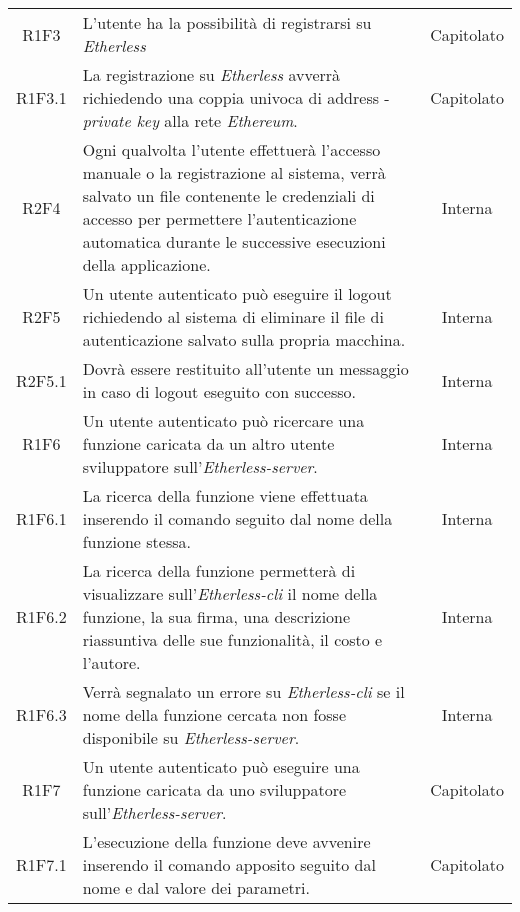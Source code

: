 \begin{longtable}{|c|p{8cm}|c|}
	R1F3 &  L'utente ha la possibilità di registrarsi su \textit{Etherless}  & Capitolato \\

	R1F3.1 &  La registrazione su \textit{Etherless} avverrà richiedendo una coppia univoca di address - \textit{private key\glo} alla rete \textit{Ethereum\glos}.  & Capitolato \\	
	
	R2F4 &  Ogni qualvolta l'utente effettuerà l'accesso manuale o la registrazione al sistema, verrà salvato un file contenente le credenziali di accesso per permettere l'autenticazione automatica durante le successive esecuzioni della applicazione.  & Interna \\
	
	R2F5 &  Un utente autenticato può eseguire il logout richiedendo al sistema di eliminare il file di autenticazione salvato sulla propria macchina.  & Interna \\
	
	R2F5.1 &  Dovrà essere restituito all'utente un messaggio in caso di logout eseguito con successo.  & Interna \\
	
	R1F6 &  Un utente autenticato può ricercare una funzione caricata da un altro utente sviluppatore sull'\textit{Etherless-server}.  & Interna \\
	
	R1F6.1 &  La ricerca della funzione viene effettuata inserendo il comando seguito dal nome della funzione stessa.  & Interna \\
	
	R1F6.2 &  La ricerca della funzione permetterà di visualizzare sull'\textit{Etherless-cli} il nome della funzione, la sua firma, una descrizione riassuntiva delle sue funzionalità, il costo e l'autore.  & Interna \\
	
	R1F6.3 &  Verrà segnalato un errore su \textit{Etherless-cli} se il nome della funzione cercata non fosse disponibile su \textit{Etherless-server}.  & Interna \\
	
	R1F7 &  Un utente autenticato può eseguire una funzione caricata da uno sviluppatore sull'\textit{Etherless-server}.  & Capitolato \\
	
	R1F7.1 &  L'esecuzione della funzione deve avvenire inserendo il comando apposito seguito dal nome e dal valore dei parametri.  & Capitolato \\


\end{longtable}
